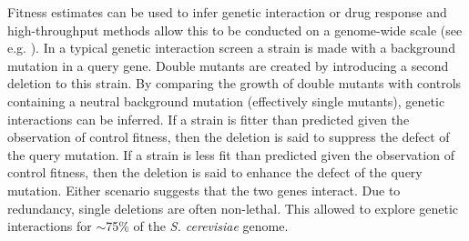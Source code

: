 

Fitness estimates can be used to infer genetic interaction or drug
response and high-throughput methods allow this to be conducted on a
genome-wide scale (see e.g. \citet{Costanzo2010,Andrew2013}). In a
typical genetic interaction screen a strain is made with a background
mutation in a query gene. Double mutants are created by introducing a
second deletion to this strain. By comparing the growth of double
mutants with controls containing a neutral background mutation
(effectively single mutants), genetic interactions can be inferred. If
a strain is fitter than predicted given the observation of control
fitness, then the deletion is said to suppress the defect of the query
mutation. If a strain is less fit than predicted given the observation
of control fitness, then the deletion is said to enhance the defect of
the query mutation. Either scenario suggests that the two genes
interact. Due to redundancy, single deletions are often
non-lethal. This allowed \citet{Costanzo2010} to explore genetic
interactions for \(\sim\)75\% of the \textit{S. cerevisiae} genome.


